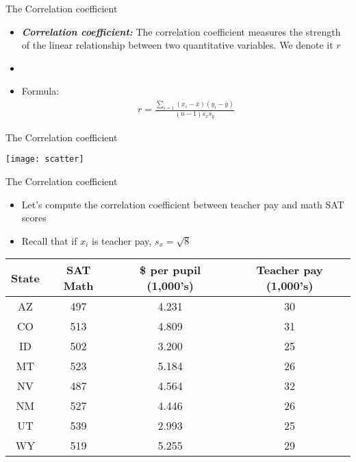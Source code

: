 \documentclass[xcolor=dvipsnames]{beamer}
\begin{document}
\begin{frame}{The Correlation coefficient}
	\begin{itemize}
		\item \textbf{\emph{Correlation coefficient:}} The correlation coefficient measures the strength of the linear relationship between two quantitative variables. We denote it $r$ \pause
		\item[]
		\item Formula: 
		\begin{gather*}
			r = \frac{\sum_{i=1}(x_i -\bar{x})(y_i - \bar{y})}{(n-1) s_x s_y}
		\end{gather*}
	\end{itemize}
\end{frame}

\begin{frame}{The Correlation coefficient}
	\begin{center}
		\texttt{[image: scatter]}
	\end{center}
\end{frame}

\begin{frame}{The Correlation coefficient}
	\begin{itemize}
		\item Let's compute the correlation coefficient between teacher pay and math SAT scores \pause
		\item Recall that if $x_i$ is teacher pay, $s_x = \sqrt{8}$
	\end{itemize}
		\begin{center}
		\begin{tabular}{|c|c|c|c|}
			\hline 
			\textbf{State} & \textbf{SAT Math} & \textbf{\$ per pupil (1,000's)} & \textbf{Teacher pay (1,000's)} \\ 
			\hline \hline
			AZ & 497  & 4.231 & 30 \\ \hline 
			CO & 513  & 4.809 & 31 \\ \hline 
			ID & 502  & 3.200 & 25  \\  \hline 
			MT & 523  & 5.184 & 26 \\ \hline 
			NV & 487  & 4.564 & 32 \\ \hline 
			NM & 527  & 4.446 & 26 \\ \hline 
			UT & 539  & 2.993 & 25 \\ \hline 
			WY & 519  & 5.255 & 29 \\ \hline 
		\end{tabular} 
	\end{center}
\end{frame}
\end{document}
